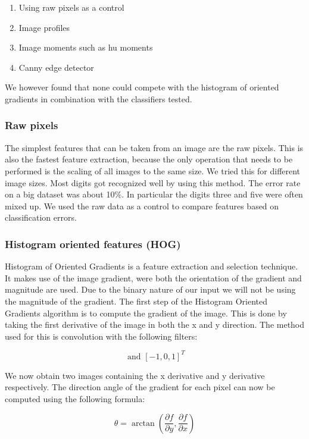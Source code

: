 \documentclass[%
        compressed,
        final,
        notitlepage,
        narroweqnarray,
        inline,
        twoside,
        ]{ieee}
\begin{document}
    \begin{enumerate}
        \item Using raw pixels as a control
        \item Image profiles
        \item Image moments such as hu moments
        \item Canny edge detector\\
    \end{enumerate}
We however found that none could compete with the histogram of oriented gradients in combination with the classifiers tested.
    \subsubsection{Raw pixels}
The simplest features that can be taken from an image are the raw pixels. This
is also the fastest feature extraction, because the only operation that needs
to be performed is the scaling of all images to the same size. We tried this for
different image sizes. Most digits got recognized well by using this method. The
error rate on a big dataset was about 10\%. In particular the digits three and five were often mixed up. We used the raw data as a control to compare features based on classification errors. 

\subsubsection{Histogram oriented features (HOG)}
Histogram of Oriented Gradients is a feature extraction and selection technique.
\cite{hog} It makes use of the image gradient, were both the orientation of the gradient and magnitude are used. Due to the binary nature of our input we will not be using the magnitude of the gradient. The first step of the Histogram Oriented Gradients algorithm is to compute the gradient of the image. This is done by taking the first derivative of the image in both the x and y direction. The method used for this is convolution with the following filters:

\begin{equation}
    [-1, 0, 1] \text{ and } [-1, 0, 1]^T
\end{equation}

We now obtain two images containing the x derivative and y derivative respectively. The direction angle of the gradient for each pixel can now be computed using the following formula: 

\begin{equation}
    \theta = \arctan\left(\frac{\partial f}{\partial y}, 
        \frac{\partial f}{\partial x}\right)
\end{equation}
\end{document}
